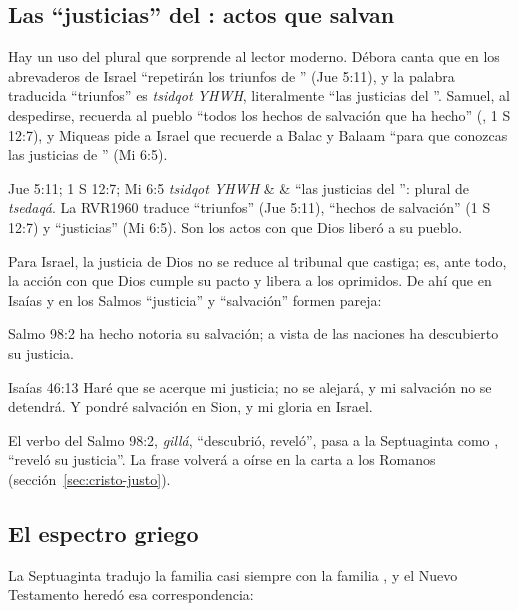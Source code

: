 \subsection{Las “justicias” del \SENOR: actos que salvan}
Hay un uso del plural que sorprende al lector moderno. Débora canta que en los abrevaderos de Israel ``repetirán los triunfos de \SENOR'' (Jue 5:11), y la palabra traducida ``triunfos'' es  \emph{tsidqot YHWH}, literalmente ``las justicias del \SENOR''. Samuel, al despedirse, recuerda al pueblo ``todos los hechos de salvación que \SENOR{} ha hecho'' (, 1 S 12:7), y Miqueas pide a Israel que recuerde a Balac y Balaam ``para que conozcas las justicias de \SENOR'' (Mi 6:5).

\begin{filologia}{Jue 5:11; 1 S 12:7; Mi 6:5}
 \emph{tsidqot YHWH} &  & ``las justicias del \SENOR'': plural de \emph{tsedaqá}. La RVR1960 traduce ``triunfos'' (Jue 5:11), ``hechos de salvación'' (1 S 12:7) y ``justicias'' (Mi 6:5). Son los actos con que Dios liberó a su pueblo. \\
\end{filologia}

Para Israel, la justicia de Dios no se reduce al tribunal que castiga; es, ante todo, la acción con que Dios cumple su pacto y libera a los oprimidos. De ahí que en Isaías y en los Salmos ``justicia'' y ``salvación'' formen pareja:

\begin{verso}{Salmo 98:2}
\SENOR{} ha hecho notoria su salvación; a vista de las naciones ha descubierto su justicia.
\end{verso}
\begin{verso}{Isaías 46:13}
Haré que se acerque mi justicia; no se alejará, y mi salvación no se detendrá. Y pondré salvación en Sion, y mi gloria en Israel.
\end{verso}

El verbo del Salmo 98:2,  \emph{gillá}, ``descubrió, reveló'', pasa a la Septuaginta como , ``reveló su justicia''. La frase volverá a oírse en la carta a los Romanos (sección~\ref{sec:cristo-justo}).

\subsection{El espectro griego}
La Septuaginta tradujo la familia  casi siempre con la familia , y el Nuevo Testamento heredó esa correspondencia:

